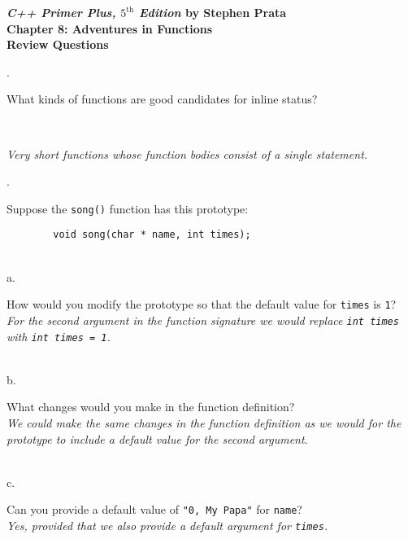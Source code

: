 \documentclass{amsart}
\begin{document}
\begin{center}
	\Large {\bfseries
	\emph{C++ Primer Plus, $5^{\text{th}}$ Edition} by Stephen Prata \\
	Chapter 8: Adventures in Functions \\
	Review Questions} \normalsize \vspace{.5 cm}
\end{center}


\vfill
{}. 
\begin{minipage}[t]{11.5 cm}
	What kinds of functions are good candidates for inline status?
\end{minipage} \\[1ex]
\phantom{3. } 
\begin{minipage}[t]{11.5 cm}
	{\slshape Very short functions whose function bodies consist of a single statement.} 
\end{minipage} 
\vfill

. 
\begin{minipage}[t]{11.5 cm}
	Suppose the \texttt{song()} function has this prototype:
	\begin{verbatim}
		void song(char * name, int times);
	\end{verbatim}
\end{minipage} \\[1ex]
\phantom{1. }a.
\begin{minipage}[t]{11.5 cm}
	How would you modify the prototype so that the default value for \texttt{times} is \texttt{1}? \\[1ex]
	{\slshape For the second argument in the function signature we would replace \verb+int times+ with \verb+int times = 1+.} \\
	{} %
\end{minipage} \\[1ex]
\phantom{1. }b.
\begin{minipage}[t]{11.5 cm}
	What changes would you make in the function definition? \\[1ex]
	{\slshape We could make the same changes in the function definition as we would for the prototype to include a default value for the second argument. }\\
	{} %
\end{minipage} \\[1ex]
\phantom{1. }c.
\begin{minipage}[t]{11.5 cm}
	Can you provide a default value of \texttt{"0, My Papa"} for \texttt{name}? \\[1ex]
	{\slshape Yes, provided that we also provide a default argument for \verb+times+. } \\
	{} %
\end{minipage}
\vfill
\end{document}
